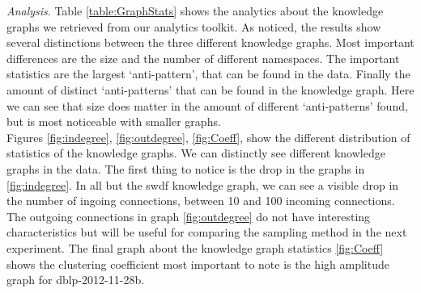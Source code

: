 \documentclass[11pt,letterpaper ,oneside ]{book}
\begin{document}
	\textit{Analysis}. Table \ref{table:GraphStats} shows the analytics about the knowledge graphs we retrieved from our analytics toolkit. As noticed, the results show several distinctions between the three different knowledge graphs. Most important differences are the size and the number of different namespaces. The important statistics are the largest `anti-pattern', that can be found in the data. Finally the amount of distinct `anti-patterns' that can be found in the knowledge graph. Here we can see that size does matter in the amount of different `anti-patterns' found, but is most noticeable with smaller graphs. \\
	Figures \ref{fig:indegree},  \ref{fig:outdegree},  \ref{fig:Coeff}, show the different distribution of statistics of the knowledge graphs. We can distinctly see different knowledge graphs in the data. The first thing to notice is the drop in the graphs in \ref{fig:indegree}. In all but the swdf knowledge graph, we can see a visible drop in the number of ingoing connections, between 10 and 100 incoming connections. \\
	The outgoing connections in graph \ref{fig:outdegree} do not have interesting characteristics but will be useful for comparing the sampling method in the next experiment. 
	The final graph about the knowledge graph statistics \ref{fig:Coeff} shows the clustering coefficient most important to note is the high amplitude graph for dblp-2012-11-28b. \\
\begin{table}[!t]
	\centering
	\caption{table showing several statistics about graphs.}
	\label{table:GraphStats}
\end{table}
\end{document}
